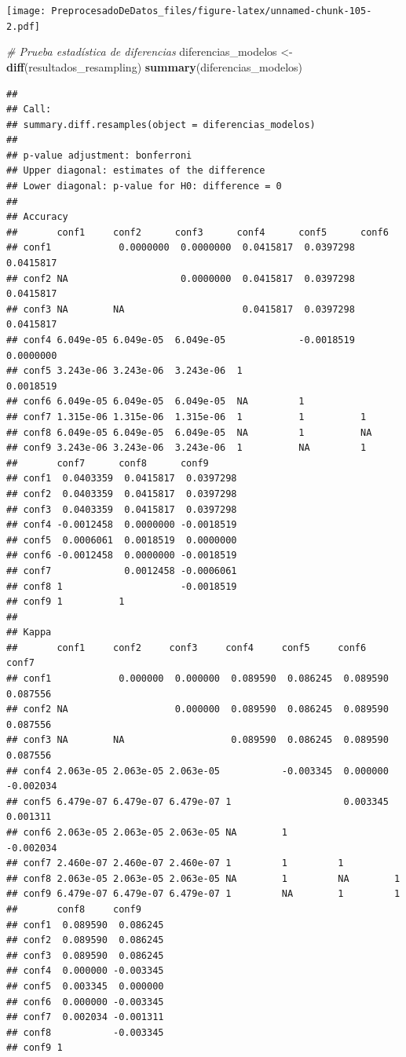 \documentclass[
]{article}
\newenvironment{Shaded}{\begin{snugshade}}{\end{snugshade}}
\newcommand{\CommentTok}[1]{\textcolor[rgb]{0.56,0.35,0.01}{\textit{#1}}}
\newcommand{\FunctionTok}[1]{\textcolor[rgb]{0.13,0.29,0.53}{\textbf{#1}}}
\newcommand{\NormalTok}[1]{#1}
\newcommand{\OtherTok}[1]{\textcolor[rgb]{0.56,0.35,0.01}{#1}}
\begin{document}
\texttt{[image: PreprocesadoDeDatos\_files/figure-latex/unnamed-chunk-105-2.pdf]}

\begin{Shaded}
\begin{Highlighting}[]
\CommentTok{\# Prueba estadística de diferencias}
\NormalTok{diferencias\_modelos }\OtherTok{\textless{}{-}} \FunctionTok{diff}\NormalTok{(resultados\_resampling)}
\FunctionTok{summary}\NormalTok{(diferencias\_modelos)}
\end{Highlighting}
\end{Shaded}

\begin{verbatim}
## 
## Call:
## summary.diff.resamples(object = diferencias_modelos)
## 
## p-value adjustment: bonferroni 
## Upper diagonal: estimates of the difference
## Lower diagonal: p-value for H0: difference = 0
## 
## Accuracy 
##       conf1     conf2      conf3      conf4      conf5      conf6     
## conf1            0.0000000  0.0000000  0.0415817  0.0397298  0.0415817
## conf2 NA                    0.0000000  0.0415817  0.0397298  0.0415817
## conf3 NA        NA                     0.0415817  0.0397298  0.0415817
## conf4 6.049e-05 6.049e-05  6.049e-05             -0.0018519  0.0000000
## conf5 3.243e-06 3.243e-06  3.243e-06  1                      0.0018519
## conf6 6.049e-05 6.049e-05  6.049e-05  NA         1                    
## conf7 1.315e-06 1.315e-06  1.315e-06  1          1          1         
## conf8 6.049e-05 6.049e-05  6.049e-05  NA         1          NA        
## conf9 3.243e-06 3.243e-06  3.243e-06  1          NA         1         
##       conf7      conf8      conf9     
## conf1  0.0403359  0.0415817  0.0397298
## conf2  0.0403359  0.0415817  0.0397298
## conf3  0.0403359  0.0415817  0.0397298
## conf4 -0.0012458  0.0000000 -0.0018519
## conf5  0.0006061  0.0018519  0.0000000
## conf6 -0.0012458  0.0000000 -0.0018519
## conf7             0.0012458 -0.0006061
## conf8 1                     -0.0018519
## conf9 1          1                    
## 
## Kappa 
##       conf1     conf2     conf3     conf4     conf5     conf6     conf7    
## conf1            0.000000  0.000000  0.089590  0.086245  0.089590  0.087556
## conf2 NA                   0.000000  0.089590  0.086245  0.089590  0.087556
## conf3 NA        NA                   0.089590  0.086245  0.089590  0.087556
## conf4 2.063e-05 2.063e-05 2.063e-05           -0.003345  0.000000 -0.002034
## conf5 6.479e-07 6.479e-07 6.479e-07 1                    0.003345  0.001311
## conf6 2.063e-05 2.063e-05 2.063e-05 NA        1                   -0.002034
## conf7 2.460e-07 2.460e-07 2.460e-07 1         1         1                  
## conf8 2.063e-05 2.063e-05 2.063e-05 NA        1         NA        1        
## conf9 6.479e-07 6.479e-07 6.479e-07 1         NA        1         1        
##       conf8     conf9    
## conf1  0.089590  0.086245
## conf2  0.089590  0.086245
## conf3  0.089590  0.086245
## conf4  0.000000 -0.003345
## conf5  0.003345  0.000000
## conf6  0.000000 -0.003345
## conf7  0.002034 -0.001311
## conf8           -0.003345
## conf9 1
\end{verbatim}
\end{document}
